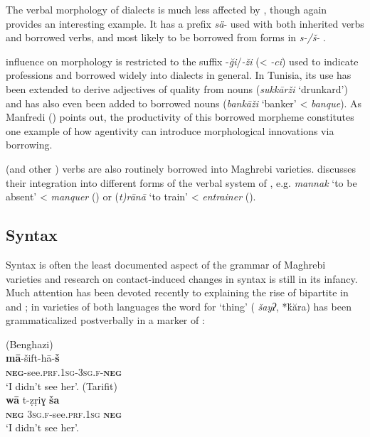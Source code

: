 \documentclass[output=paper]{langsci/langscibook}
\begin{document}
  The verbal morphology of  dialects is much less affected by , though  again provides an interesting example. It has a  prefix \textit{sä}- used with both inherited  verbs and borrowed  verbs, and most likely to be borrowed from   forms in \textit{s-/š-} \citep{Taine-Cheikh2008chapter}.

   influence on morphology is restricted to the suffix -\textit{ği}/\textit{{}-ži} (< \textit{{}-ci}) used to indicate professions and borrowed widely into  dialects in general. In Tunisia, its use has been extended to derive adjectives of quality from nouns (\textit{sukkārži} ‘drunkard’) and has also even been added to borrowed  nouns (\textit{bankāži} ‘banker’ <  \textit{banque}). As Manfredi (\citeyear[410]{Manfredi2018}) points out, the productivity of this borrowed  morpheme constitutes one example of how  agentivity can introduce morphological innovations via borrowing.

   (and other ) verbs are also routinely borrowed into Maghrebi varieties. \citet{Talmoudi1986} discusses their integration into different forms of the verbal system of  , e.g. \textit{mannak} `to be absent' <  \textit{manquer} (\citeyear[81--82]{Talmoudi1986}) or (\textit{t)rānā} `to train' <  \textit{entrainer} (\citeyear[21--24]{Talmoudi1986}).

\subsection{ Syntax}

Syntax is often the least documented aspect of the grammar of Maghrebi  varieties and research on contact-induced changes in syntax is still in its infancy. Much attention has been devoted recently to explaining the rise of bipartite  in  and ; in varieties of both languages the word for ‘thing’ ( \textit{šayʔ},  *ḱăra) has been grammaticalized postverbally in a marker of :

\begin{multicols}{2}
\begin{exe}
\ex
{} (Benghazi)\\
\gll \textbf{mā}-šift-hā-\textbf{š}\\
     \textbf{\textsc{neg}}-see.\textsc{prf}.\textsc{1sg}-\textsc{3sg.f}-\textbf{\textsc{neg}}\\
\glt `I didn’t see her'.
\ex  {} (Tarifit)\\
\gll \textbf{wā}  t-ẓṛiɣ  \textbf{ša}\\
     \textbf{\textsc{neg}}  \textsc{3sg.f}-see.\textsc{prf}.\textsc{1sg}  \textbf{\textsc{neg}}\\
\glt `I didn’t see her'.
\end{exe}
\end{multicols}
\end{document}
